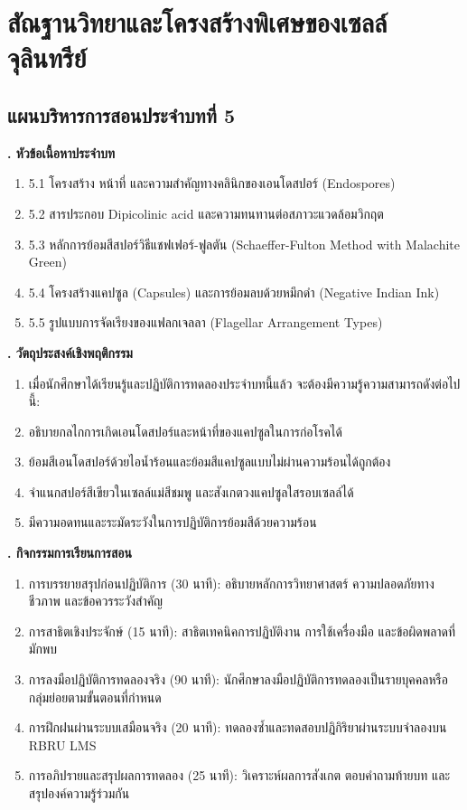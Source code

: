 \chapter{สัณฐานวิทยาและโครงสร้างพิเศษของเซลล์จุลินทรีย์}
\label{chap:ch05}

\section*{แผนบริหารการสอนประจำบทที่ 5}

\noindent\textbf{. หัวข้อเนื้อหาประจำบท}

\begin{enumerate}
    \item 5.1 โครงสร้าง หน้าที่ และความสำคัญทางคลินิกของเอนโดสปอร์ (Endospores)
    \item 5.2 สารประกอบ Dipicolinic acid และความทนทานต่อสภาวะแวดล้อมวิกฤต
    \item 5.3 หลักการย้อมสีสปอร์วิธีแชฟเฟอร์-ฟูลตัน (Schaeffer-Fulton Method with Malachite Green)
    \item 5.4 โครงสร้างแคปซูล (Capsules) และการย้อมลบด้วยหมึกดำ (Negative Indian Ink)
    \item 5.5 รูปแบบการจัดเรียงของแฟลกเจลลา (Flagellar Arrangement Types)
\end{enumerate}

\noindent\textbf{. วัตถุประสงค์เชิงพฤติกรรม}

\begin{enumerate}
    \item เมื่อนักศึกษาได้เรียนรู้และปฏิบัติการทดลองประจำบทนี้แล้ว จะต้องมีความรู้ความสามารถดังต่อไปนี้:
    \item อธิบายกลไกการเกิดเอนโดสปอร์และหน้าที่ของแคปซูลในการก่อโรคได้
    \item ย้อมสีเอนโดสปอร์ด้วยไอน้ำร้อนและย้อมสีแคปซูลแบบไม่ผ่านความร้อนได้ถูกต้อง
    \item จำแนกสปอร์สีเขียวในเซลล์แม่สีชมพู และสังเกตวงแคปซูลใสรอบเซลล์ได้
    \item มีความอดทนและระมัดระวังในการปฏิบัติการย้อมสีด้วยความร้อน
\end{enumerate}

\noindent\textbf{. กิจกรรมการเรียนการสอน}

\begin{enumerate}
    \item การบรรยายสรุปก่อนปฏิบัติการ (30 นาที): อธิบายหลักการวิทยาศาสตร์ ความปลอดภัยทางชีวภาพ และข้อควรระวังสำคัญ
    \item การสาธิตเชิงประจักษ์ (15 นาที): สาธิตเทคนิคการปฏิบัติงาน การใช้เครื่องมือ และข้อผิดพลาดที่มักพบ
    \item การลงมือปฏิบัติการทดลองจริง (90 นาที): นักศึกษาลงมือปฏิบัติการทดลองเป็นรายบุคคลหรือกลุ่มย่อยตามขั้นตอนที่กำหนด
    \item การฝึกฝนผ่านระบบเสมือนจริง (20 นาที): ทดลองซ้ำและทดสอบปฏิกิริยาผ่านระบบจำลองบน RBRU LMS
    \item การอภิปรายและสรุปผลการทดลอง (25 นาที): วิเคราะห์ผลการสังเกต ตอบคำถามท้ายบท และสรุปองค์ความรู้ร่วมกัน
\end{enumerate}

